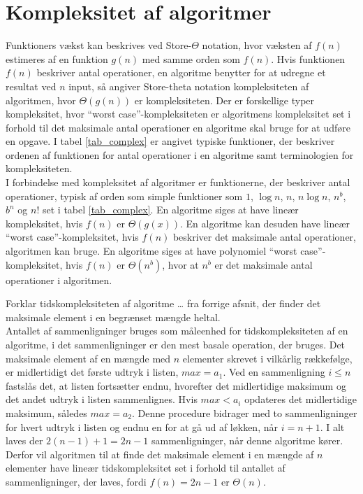 \section{Kompleksitet af algoritmer}
Funktioners vækst kan beskrives ved Store-$\Theta$ notation, hvor væksten af $f(n)$ estimeres af en funktion $g(n)$ med samme orden som $f(n)$. 
Hvis funktionen $f(n)$ beskriver antal operationer, en algoritme benytter for at udregne et resultat ved $n$ input, så angiver Store-theta notation kompleksiteten af algoritmen, hvor $\Theta(g(n))$ er kompleksiteten. 
Der er forskellige typer kompleksitet, hvor “worst case”-kompleksiteten er algoritmens kompleksitet set i forhold til det maksimale antal operationer en algoritme skal bruge for at udføre en opgave.
I tabel \ref{tab_complex} er angivet typiske funktioner, der beskriver  ordenen af funktionen for antal operationer i en algoritme samt terminologien for kompleksiteten.\\



I forbindelse med kompleksitet af algoritmer er funktionerne, der beskriver antal operationer, typisk af orden som simple funktioner som $1$, $\log n$, $n$, $n \log n$, $n^b$, $b^n$ og $n!$ set i tabel \ref{tab_complex}. 
En algoritme siges at have lineær kompleksitet, hvis $f(n)$ er $\Theta(g(x))$. 
En algoritme kan desuden have lineær “worst case”-kompleksitet, hvis $f(n)$ beskriver det maksimale antal operationer, algoritmen kan bruge. 
En algoritme siges at have polynomiel “worst case”-kompleksitet, hvis $f(n)$ er $\Theta(n^b)$, hvor at $n^b$ er det maksimale antal operationer i algoritmen.

\begin{exmp}
Forklar tidskompleksiteten af algoritme … fra forrige afsnit, der finder det maksimale element i en begrænset mængde heltal.\\ 
Antallet af sammenligninger bruges som måleenhed for tidskompleksiteten af en algoritme, i det sammenligninger er den mest basale operation, der bruges.
Det maksimale element af en mængde med $n$ elementer skrevet i vilkårlig rækkefølge, er midlertidigt det første udtryk i listen, $max=a_1$. 
Ved en sammenligning $i \leq n$ fastslås det, at listen fortsætter endnu, hvorefter det midlertidige maksimum og det andet udtryk i listen sammenlignes. 
Hvis $max<a_i$ opdateres det midlertidige maksimum, således $max=a_2$.
Denne procedure bidrager med to sammenligninger for hvert udtryk i listen og endnu en for at gå ud af løkken, når $i=n+1$. 
I alt laves der $2(n-1)+1=2n-1$ sammenligninger, når denne algoritme kører. 
Derfor vil algoritmen til at finde det maksimale element i en mængde af $n$ elementer have lineær tidskompleksitet set i forhold til antallet af sammenligninger, der laves, fordi $f(n)=2n-1$ er $\Theta (n)$.  
\end{exmp}
